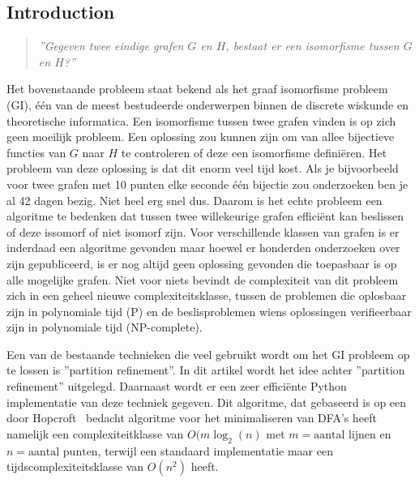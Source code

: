 \documentclass[twoside]{article}
\begin{document}
\begin{multicols}{2} %



\section*{Introduction}
\begin{quote}
\textit{''Gegeven twee eindige grafen $G$ en $H$, bestaat er een isomorfisme tussen $G$ en $H$?''}
\end{quote}

Het bovenstaande probleem staat bekend als het graaf isomorfisme probleem  (GI), één van de meest bestudeerde onderwerpen binnen de discrete wiskunde en theoretische informatica. Een isomorfisme tussen twee grafen vinden is op zich geen moeilijk probleem. Een oplossing zou kunnen zijn om van allee bijectieve functies van $G$ naar $H$ te controleren of deze een isomorfisme defini\"eren. Het probleem van deze oplossing is dat dit enorm veel tijd kost. Als je bijvoorbeeld voor twee grafen met 10 punten elke seconde \'e\'en bijectie zou onderzoeken ben je al 42 dagen bezig. Niet heel erg snel dus. Daarom is het echte probleem een algoritme te bedenken dat tussen twee willekeurige grafen effici\"ent kan beslissen of deze issomorf of niet isomorf zijn. Voor verschillende klassen van grafen is er inderdaad een algoritme gevonden maar hoewel er honderden onderzoeken over zijn gepubliceerd, is er nog altijd geen oplossing gevonden die toepasbaar is op alle mogelijke grafen. Niet voor niets bevindt de complexiteit van dit probleem zich in een geheel nieuwe complexiteitsklasse, tussen de problemen die oplosbaar zijn in polynomiale tijd (P) en de beslisproblemen wiens oplossingen verifieerbaar zijn in polynomiale tijd (NP-complete).

Een van de bestaande technieken die veel gebruikt wordt om het GI probleem op te lossen is ''partition refinement''. In dit artikel wordt het idee achter ''partition refinement'' uitgelegd. Daarnaast wordt er een zeer effici\"ente Python implementatie van deze techniek gegeven. Dit algoritme, dat gebaseerd is op een door Hopcroft~\cite{MR0403320} bedacht algoritme voor het minimaliseren van DFA's heeft namelijk een complexiteitklasse van $O(m \log_{2} (n)$ met $m= \text{aantal lijnen}$ en $n = \text{aantal punten}$, terwijl een standaard implementatie maar een tijdscomplexiteitsklasse van $O(n^2)$ heeft.


\end{multicols}
\end{document}
